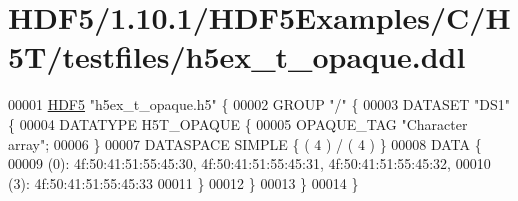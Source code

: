 \hypertarget{_h_d_f5_21_810_81_2_h_d_f5_examples_2_c_2_h5_t_2testfiles_2h5ex__t__opaque_8ddl_source}{}\section{H\+D\+F5/1.10.1/\+H\+D\+F5\+Examples/\+C/\+H5\+T/testfiles/h5ex\+\_\+t\+\_\+opaque.ddl}
\label{_h_d_f5_21_810_81_2_h_d_f5_examples_2_c_2_h5_t_2testfiles_2h5ex__t__opaque_8ddl_source}

\begin{DoxyCode}
00001 \hyperlink{namespace_h_d_f5}{HDF5} \textcolor{stringliteral}{"h5ex\_t\_opaque.h5"} \{
00002 GROUP \textcolor{stringliteral}{"/"} \{
00003    DATASET \textcolor{stringliteral}{"DS1"} \{
00004       DATATYPE  H5T\_OPAQUE \{
00005          OPAQUE\_TAG \textcolor{stringliteral}{"Character array"};
00006       \}
00007       DATASPACE  SIMPLE \{ ( 4 ) / ( 4 ) \}
00008       DATA \{
00009       (0): 4f:50:41:51:55:45:30, 4f:50:41:51:55:45:31, 4f:50:41:51:55:45:32,
00010       (3): 4f:50:41:51:55:45:33
00011       \}
00012    \}
00013 \}
00014 \}
\end{DoxyCode}
